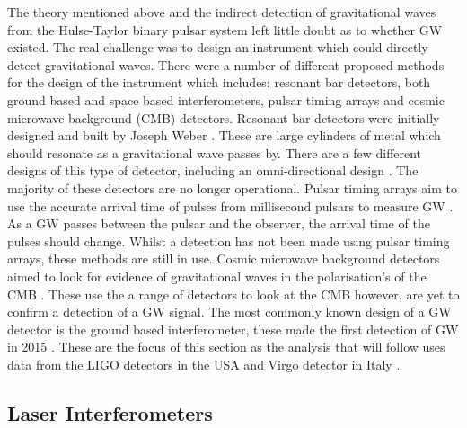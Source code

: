 The theory mentioned above and the indirect detection of gravitational waves from the Hulse-Taylor binary pulsar system left little doubt as to whether \gls{GW} existed. 
The real challenge was to design an instrument which could directly detect gravitational waves.
There were a number of different proposed methods for the design of the instrument which includes: resonant bar detectors, both ground based and space based interferometers, pulsar timing arrays and cosmic microwave background (CMB) detectors. 
Resonant bar detectors were initially designed and built by Joseph Weber \citep{weber1966ObservationThermal}. 
These are large cylinders of metal which should resonate as a gravitational wave passes by. 
There are a few different designs of this type of detector, including an omni-directional design \citep{dewaard2003MiniGRAILFirst}. 
The majority of these detectors are no longer operational.
Pulsar timing arrays aim to use the accurate arrival time of pulses from millisecond pulsars to measure \gls{GW} \citep{hobbs2017GravitationalWave}. As a \gls{GW} passes between the pulsar and the observer, the arrival time of the pulses should change. 
Whilst a detection has not been made using pulsar timing arrays, these methods are still in use.
Cosmic microwave background detectors aimed to look for evidence of gravitational waves in the polarisation's of the CMB \citep{ade2018ConstraintsPrimordial}.  
These use the a range of detectors to look at the CMB however, are yet to confirm a detection of a \gls{GW} signal.
The most commonly known design of a \gls{GW} detector is the ground based interferometer, these made the first detection of \gls{GW} in 2015 \citep{abbott2016ObservationGravitational}. 
These are the focus of this section as the analysis that will follow uses data from the \gls{LIGO} detectors in the USA \citep{abbott2009LIGOLaser,aasi2015AdvancedLIGO} and Virgo detector in Italy \citep{acernese2015AdvancedVirgo,acernese2008StatusVirgo}. 

\subsection{Laser Interferometers}

